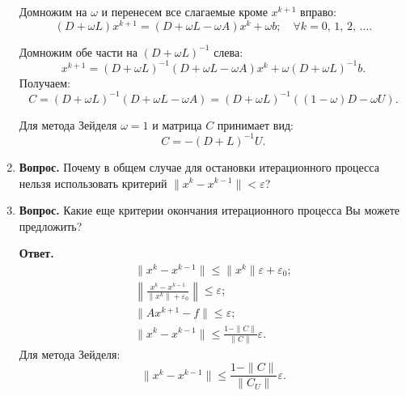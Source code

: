 \documentclass[12pt, a4paper]{article}
\begin{document}
\begin{enumerate}
  	Домножим на $\omega$ и перенесем все слагаемые кроме $x^{k + 1}$ вправо:
  	$$\left( D + \omega L \right)x^{k + 1} = \left( D + \omega L -\omega A \right)x^k +\omega b; \quad \forall k = 0,\, 1,\, 2,\, \dots. $$
  	
  	Домножим обе части на $ \left( D + \omega L \right)^{-1}$ слева:
  		$$x^{k + 1} = \left( D + \omega L \right)^{-1} \left( D + \omega L -\omega A \right)x^k +\omega \left( D + \omega L \right)^{-1} b. $$
  	Получаем:
  	$$ C = \left( D + \omega L \right)^{-1} \left( D + \omega L -\omega A \right) = \left( D + \omega L \right)^{-1} \left( \left( 1 - \omega \right) D  -\omega U \right).  $$
  	
  	Для метода Зейделя $\omega = 1$ и матрица $C$ принимает вид:
  	$$ C = - \left( D + L \right)^{-1}U.  $$ 
  	
 	\item  \textbf{Вопрос.} Почему в общем случае для остановки итерационного процесса нельзя использовать критерий $\| x^k - x^{k-1} \| < \varepsilon$?
 	
 	\item  \textbf{Вопрос.} Какие еще критерии окончания итерационного процесса Вы можете предложить?
 	
 	 \textbf{Ответ.}
 	\begin{gather*}
 		\| x^k - x^{k - 1} \| \leq \| x^k\| \varepsilon + \varepsilon_0; \\
 		\left\| \frac{ x^k - x^{k - 1}}{\| x^k \| + \varepsilon_0} \right\| \leq \varepsilon; \\
 		 		\| A x^{k + 1} - f \| \leq \varepsilon; \\
 		\| x^k - x^{k - 1}\| \leq \frac{1 - \| C \|}{\| C \|} \varepsilon. 
 	\end{gather*}
 	Для метода Зейделя:
 	$$\| x^k - x^{k - 1} \| \leq \frac{1-\| C \|}{\| C_U \|} \varepsilon.$$
 	
  	
  	
		\end{enumerate}

	
\end{document}
